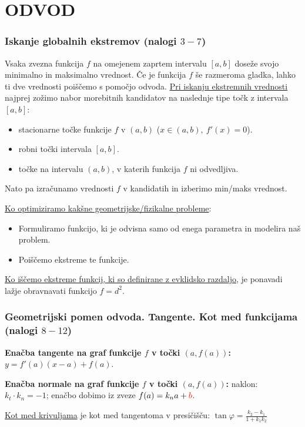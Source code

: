 \section{ODVOD}

{\color{Purple} \subsubsection*{Iskanje globalnih ekstremov (nalogi $3-7$)}}
%
Vsaka zvezna funkcija $f$ na omejenem zaprtem intervalu $[a, b]$ doseže svojo minimalno in maksimalno vrednost. Če je funkcija $f$ še razmeroma gladka, lahko ti dve vrednosti poiščemo s pomočjo odvoda. \underline{Pri iskanju ekstremnih vrednosti} najprej zožimo nabor morebitnih kandidatov na naslednje tipe točk z intervala $[a,b]$:
\begin{itemize}
    \item stacionarne točke funkcije $f$ v $(a,b)$ ($x \in (a,b), \ f'(x)=0$).
    \item robni točki intervala $[a,b]$.
    \item točke na intervalu $(a,b)$, v katerih funkcija $f$ ni odvedljiva.
\end{itemize}
Nato pa izračunamo vrednosti $f$ v kandidatih in izberimo min/maks vrednost.

\underline{Ko optimiziramo kakšne geometrijske/fizikalne probleme}:
\begin{itemize}
    \item Formuliramo funkcijo, ki je odvisna samo od enega parametra in modelira naš problem.
    \item Poiščemo ekstreme te funkcije.
\end{itemize}
%
\underline{Ko iščemo ekstreme funkcij, ki so definirane z evklidsko razdaljo}, je ponavadi lažje obravnavati funkcijo $f=d^2$.
%
{\color{Purple} \subsubsection*{Geometrijski pomen odvoda. Tangente. Kot med funkcijama (nalogi $8-12$)}}
\textbf{Enačba tangente na graf funkcije $f$ v točki $(a, f(a))$:} $y = f'(a)(x-a) + f(a)$.

\textbf{Enačba normale na graf funkcije $f$ v točki $(a, f(a))$:} naklon: $k_t \cdot k_n = -1$; enačbo dobimo iz zveze $f(a) = k_n a + \textcolor{red}{b}$.

\underline{Kot med krivuljama} je kot med tangentoma v presičišču: $\displaystyle \tan \varphi = \frac{k_2 - k_1}{1+k_1 k_2}$

